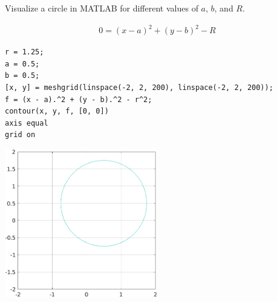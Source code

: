 Visualize a circle in MATLAB for different values of $a$, $b$, and $R$.

\begin{solution}
\begin{align*}
    0 = \left( x - a \right)^2 + \left( y - b \right)^2 - R
\end{align*}

\begin{lstlisting}
r = 1.25;
a = 0.5;
b = 0.5;
[x, y] = meshgrid(linspace(-2, 2, 200), linspace(-2, 2, 200));
f = (x - a).^2 + (y - b).^2 - r^2;
contour(x, y, f, [0, 0])
axis equal
grid on
\end{lstlisting}

\begin{center}
    \includegraphics[width=0.5\textwidth]{img/e5p1.png}
\end{center}
\end{solution}